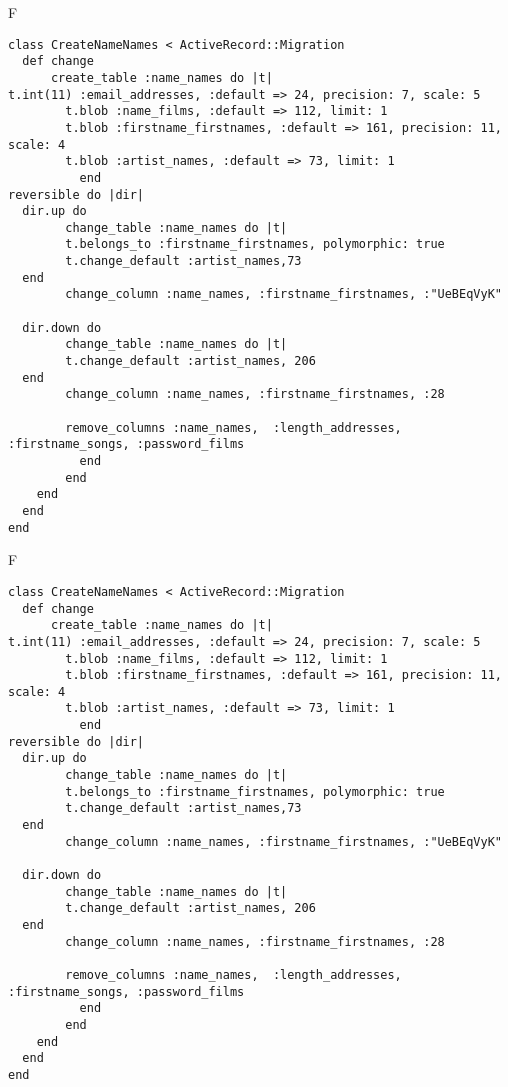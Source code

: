 F
\begin{verbatim}
class CreateNameNames < ActiveRecord::Migration
  def change
	  create_table :name_names do |t|
t.int(11) :email_addresses, :default => 24, precision: 7, scale: 5
		t.blob :name_films, :default => 112, limit: 1
		t.blob :firstname_firstnames, :default => 161, precision: 11, scale: 4
		t.blob :artist_names, :default => 73, limit: 1
		  end
reversible do |dir|
  dir.up do
		change_table :name_names do |t|
		t.belongs_to :firstname_firstnames, polymorphic: true
 		t.change_default :artist_names,73
  end
 		change_column :name_names, :firstname_firstnames, :"UeBEqVyK"
   
  dir.down do
		change_table :name_names do |t|
		t.change_default :artist_names, 206
  end
 		change_column :name_names, :firstname_firstnames, :28
   
		remove_columns :name_names,  :length_addresses, :firstname_songs, :password_films 
	      end
	    end
    end 
  end
end

\end{verbatim}

F
\begin{verbatim}
class CreateNameNames < ActiveRecord::Migration
  def change
	  create_table :name_names do |t|
t.int(11) :email_addresses, :default => 24, precision: 7, scale: 5
		t.blob :name_films, :default => 112, limit: 1
		t.blob :firstname_firstnames, :default => 161, precision: 11, scale: 4
		t.blob :artist_names, :default => 73, limit: 1
		  end
reversible do |dir|
  dir.up do
		change_table :name_names do |t|
		t.belongs_to :firstname_firstnames, polymorphic: true
 		t.change_default :artist_names,73
  end
 		change_column :name_names, :firstname_firstnames, :"UeBEqVyK"
   
  dir.down do
		change_table :name_names do |t|
		t.change_default :artist_names, 206
  end
 		change_column :name_names, :firstname_firstnames, :28
   
		remove_columns :name_names,  :length_addresses, :firstname_songs, :password_films 
	      end
	    end
    end 
  end
end

\end{verbatim}

